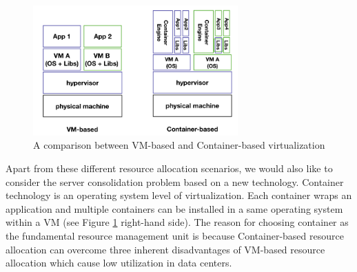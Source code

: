 


\begin{figure}
	\centering
	\includegraphics[width=0.7\textwidth]{pics/comparison.png}
	\caption{A comparison between VM-based and Container-based virtualization}
	\label{fig:comparison}
\end{figure}

Apart from these different resource allocation scenarios, we would also like to consider the server consolidation problem based on a new technology. Container technology \cite{Soltesz:2007cu} is an operating system level of virtualization. Each container wraps an application and multiple containers can be installed in a same operating system within a VM (see Figure \ref{fig:comparison} right-hand side). The reason for choosing container as the fundamental resource management unit is because
Container-based resource allocation can overcome three inherent disadvantages of VM-based resource allocation which cause low utilization in data centers.

